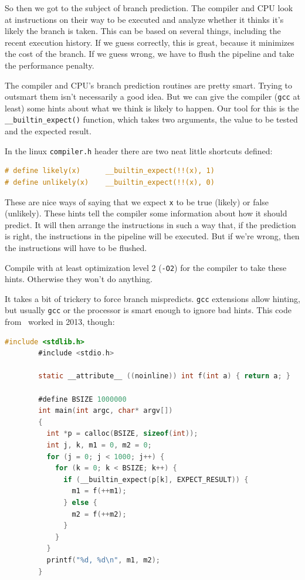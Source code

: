 \documentclass[a4paper]{report}
\begin{document}
So then we got to the subject of branch prediction. The compiler and CPU look at instructions on their way to be executed and analyze whether it thinks it's likely the branch is taken. This can be based on several things, including the recent execution history. If we guess correctly, this is great, because it minimizes the cost of the branch. If we guess wrong, we have to flush the pipeline and take the performance penalty.

The compiler and CPU's branch prediction routines are pretty smart. Trying to outsmart them isn't necessarily a good idea. But we can give the compiler (\texttt{gcc} at least) some hints about what we think is likely to happen. Our tool for this is the \texttt{\_\_builtin\_expect()} function, which takes two arguments, the value to be tested and the expected result.

In the linux \texttt{compiler.h} header there are two neat little shortcuts defined:

\begin{lstlisting}[language=C]
# define likely(x)      __builtin_expect(!!(x), 1)
# define unlikely(x)    __builtin_expect(!!(x), 0)
\end{lstlisting}

These are nice ways of saying that we expect \texttt{x} to be true (likely) or false (unlikely). These hints tell the compiler some information about how it should predict. It will then arrange the instructions in such a way that, if the prediction is right, the instructions in the pipeline will be executed. But if we're wrong, then the instructions will have to be flushed.

Compile with at least optimization level 2 (\texttt{-O2}) for the compiler to take these hints. Otherwise they won't do anything. 

It takes a bit of trickery to force branch mispredicts. {\tt gcc} extensions allow hinting, but usually {\tt gcc} or the processor is smart enough to ignore bad hints. This code from~\cite{mispredict} worked in 2013, though:


\begin{lstlisting}[language=C]
        #include <stdlib.h>
        #include <stdio.h>

        static __attribute__ ((noinline)) int f(int a) { return a; }

        #define BSIZE 1000000
        int main(int argc, char* argv[]) 
        {
          int *p = calloc(BSIZE, sizeof(int));
          int j, k, m1 = 0, m2 = 0;
          for (j = 0; j < 1000; j++) {
            for (k = 0; k < BSIZE; k++) {
              if (__builtin_expect(p[k], EXPECT_RESULT)) {
                m1 = f(++m1);
              } else {
                m2 = f(++m2);
              }
            }
          }
          printf("%d, %d\n", m1, m2);
        }
\end{lstlisting}
\end{document}
